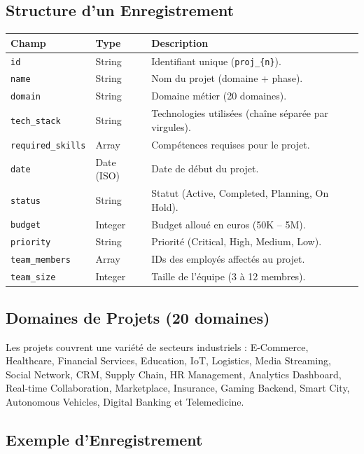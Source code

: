 \documentclass[12pt,a4paper]{article}
\begin{document}
\subsection{Structure d'un Enregistrement}

\begin{longtable}{|p{3.5cm}|p{2.5cm}|p{7.5cm}|}
\hline
\rowcolor{bleu!15}
\textbf{Champ} & \textbf{Type} & \textbf{Description} \\
\hline
\texttt{id} & String & Identifiant unique (\texttt{proj\_\{n\}}). \\
\hline
\texttt{name} & String & Nom du projet (domaine + phase). \\
\hline
\texttt{domain} & String & Domaine métier (20 domaines). \\
\hline
\texttt{tech\_stack} & String & Technologies utilisées (chaîne séparée par virgules). \\
\hline
\texttt{required\_skills} & Array & Compétences requises pour le projet. \\
\hline
\texttt{date} & Date (ISO) & Date de début du projet. \\
\hline
\texttt{status} & String & Statut (Active, Completed, Planning, On Hold). \\
\hline
\texttt{budget} & Integer & Budget alloué en euros (50K -- 5M). \\
\hline
\texttt{priority} & String & Priorité (Critical, High, Medium, Low). \\
\hline
\texttt{team\_members} & Array & IDs des employés affectés au projet. \\
\hline
\texttt{team\_size} & Integer & Taille de l'équipe (3 à 12 membres). \\
\hline
\end{longtable}

\subsection{Domaines de Projets (20 domaines)}

Les projets couvrent une variété de secteurs industriels : E-Commerce, Healthcare, Financial Services, Education, IoT, Logistics, Media Streaming, Social Network, CRM, Supply Chain, HR Management, Analytics Dashboard, Real-time Collaboration, Marketplace, Insurance, Gaming Backend, Smart City, Autonomous Vehicles, Digital Banking et Telemedicine.

\subsection{Exemple d'Enregistrement}
\end{document}
